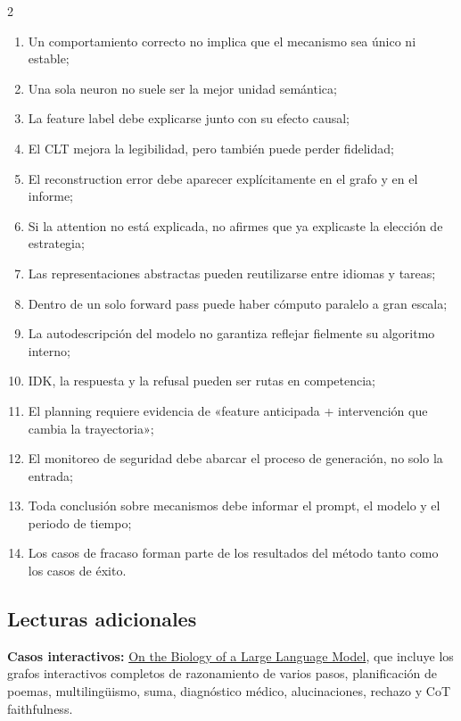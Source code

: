 \small
\begin{multicols}{2}
\begin{enumerate}
  \item Un comportamiento correcto no implica que el mecanismo sea único ni estable;
  \item Una sola neuron no suele ser la mejor unidad semántica;
  \item La feature label debe explicarse junto con su efecto causal;
  \item El CLT mejora la legibilidad, pero también puede perder fidelidad;
  \item El reconstruction error debe aparecer explícitamente en el grafo y en el informe;
  \item Si la attention no está explicada, no afirmes que ya explicaste la elección de estrategia;
  \item Las representaciones abstractas pueden reutilizarse entre idiomas y tareas;
  \item Dentro de un solo forward pass puede haber cómputo paralelo a gran escala;
  \item La autodescripción del modelo no garantiza reflejar fielmente su algoritmo interno;
  \item IDK, la respuesta y la refusal pueden ser rutas en competencia;
  \item El planning requiere evidencia de «feature anticipada + intervención que cambia la trayectoria»;
  \item El monitoreo de seguridad debe abarcar el proceso de generación, no solo la entrada;
  \item Toda conclusión sobre mecanismos debe informar el prompt, el modelo y el periodo de tiempo;
  \item Los casos de fracaso forman parte de los resultados del método tanto como los casos de éxito.
\end{enumerate}
\end{multicols}
\normalsize

\enlargethispage{4\baselineskip}
\subsection{Lecturas adicionales}

\small
\noindent\textbf{Casos interactivos: }\href{https://transformer-circuits.pub/2025/attribution-graphs/biology.html}{On the Biology of a Large Language Model}, que incluye los grafos interactivos completos de razonamiento de varios pasos, planificación de poemas, multilingüismo, suma, diagnóstico médico, alucinaciones, rechazo y CoT faithfulness.


